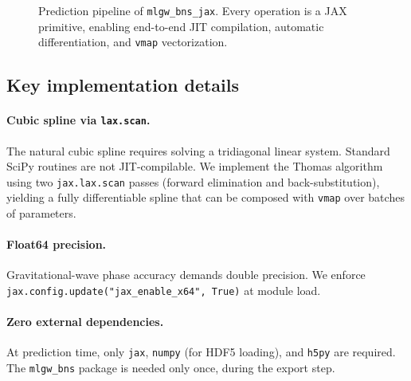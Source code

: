 \documentclass[twocolumn,superscriptaddress,nofootinbib,aps,prd]{revtex4-2}
\begin{document}
\begin{figure}[t]
\centering
{}
\caption{Prediction pipeline of \texttt{mlgw\_bns\_jax}.  Every operation is
a JAX primitive, enabling end-to-end JIT compilation, automatic
differentiation, and \texttt{vmap} vectorization.}
\label{fig:pipeline}
\end{figure}


\subsection{Key implementation details}

\paragraph{Cubic spline via \texttt{lax.scan}.}
The natural cubic spline requires solving a tridiagonal linear system.
Standard SciPy routines are not JIT-compilable.  We implement the Thomas
algorithm using two \texttt{jax.lax.scan} passes (forward elimination and
back-substitution), yielding a fully differentiable spline that can be
composed with \texttt{vmap} over batches of parameters.

\paragraph{Float64 precision.}
Gravitational-wave phase accuracy demands double precision.  We enforce
\texttt{jax.config.update("jax\_enable\_x64", True)} at module load.

\paragraph{Zero external dependencies.}
At prediction time, only \texttt{jax}, \texttt{numpy} (for HDF5 loading), and
\texttt{h5py} are required.  The \texttt{mlgw\_bns} package is needed only
once, during the export step.
\end{document}
